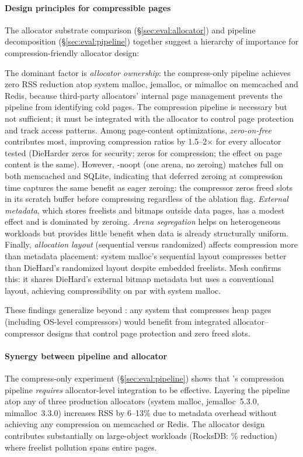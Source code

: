 \paragraph{Design principles for compressible pages}
The allocator substrate comparison (\S\ref{sec:eval:allocator})
and pipeline decomposition (\S\ref{sec:eval:pipeline}) together
suggest a hierarchy of importance for compression-friendly allocator
design:

The dominant factor is \emph{allocator ownership}: the compress-only
pipeline achieves zero RSS reduction atop system malloc, jemalloc, or
mimalloc on memcached and Redis, because third-party allocators' internal
page management prevents the pipeline from identifying cold pages.
The compression pipeline is necessary but not sufficient; it must be
integrated with the allocator to control page protection and track
access patterns.  Among page-content
optimizations, \emph{zero-on-free} contributes most, improving
compression ratios by 1.5--2$\times$ for every allocator tested
(DieHarder zeros for security; \sys zeros for compression; the effect
on page content is the same).  However, \sys-noopt (one arena, no
zeroing) matches full \sys on both memcached and SQLite, indicating
that deferred zeroing at compression time captures the same benefit
as eager zeroing: the compressor zeros freed slots in its scratch
buffer before compressing regardless of the ablation flag.
\emph{External metadata}, which stores freelists and bitmaps
outside data pages, has a modest effect and is dominated by
zeroing.  \emph{Arena segregation} helps on heterogeneous
workloads but provides little benefit when data is already
structurally uniform.  Finally, \emph{allocation layout}
(sequential versus randomized) affects compression more than
metadata placement: system malloc's sequential
layout compresses better than DieHard's randomized layout despite
embedded freelists.  Mesh confirms this: it shares DieHard's
external bitmap metadata but uses a conventional layout, achieving
compressibility on par with system malloc.

These findings generalize beyond \sys: any system that compresses
heap pages (including OS-level compressors) would benefit from
integrated allocator--compressor designs that control page protection
and zero freed slots.

\paragraph{Synergy between pipeline and allocator}
The compress-only experiment (\S\ref{sec:eval:pipeline}) shows
that \sys's compression pipeline \emph{requires} allocator-level
integration to be effective.  Layering the pipeline atop any of
three production allocators (system malloc, jemalloc~5.3.0,
mimalloc~3.3.0) increases RSS by 6--13\% due to metadata overhead
without achieving any compression on memcached or Redis.  The
allocator design contributes substantially on large-object workloads
(RocksDB: \coRocksdbFullSmashReduction\% reduction) where
freelist pollution spans entire pages.

